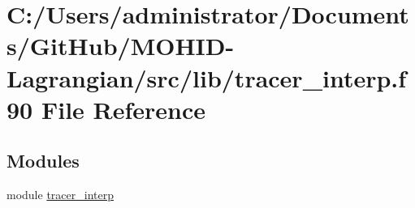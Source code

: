 \hypertarget{tracer__interp_8f90}{}\section{C\+:/\+Users/administrator/\+Documents/\+Git\+Hub/\+M\+O\+H\+I\+D-\/\+Lagrangian/src/lib/tracer\+\_\+interp.f90 File Reference}
\label{tracer__interp_8f90}
\subsection*{Modules}
\begin{DoxyCompactItemize}
\item 
module \mbox{\hyperlink{namespacetracer__interp}{tracer\+\_\+interp}}
\end{DoxyCompactItemize}
